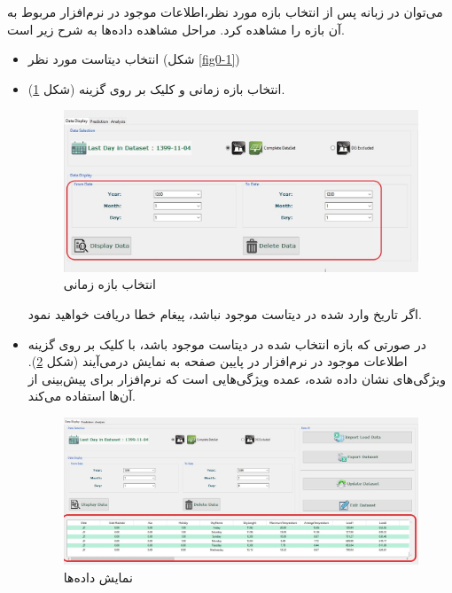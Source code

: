 \documentclass[a4paper,20pt,dvipsnames, usenames]{extbook}
\begin{document}
می‌توان در زبانه  پس از انتخاب بازه مورد نظر،‌اطلاعات موجود در نرم‌افزار مربوط به آن بازه را مشاهده کرد. 
مراحل مشاهده داده‌ها به شرح زیر است.
\begin{itemize}
	\item
	انتخاب دیتاست مورد نظر (شکل \ref{fig0-1})
	
	\item
	انتخاب بازه زمانی و کلیک بر روی گزینه 
(شکل
\ref{fig2}).
	\begin{figure}[!h]
		\centering
		\includegraphics[width = \textwidth]{fig16}
		\caption{انتخاب بازه زمانی}
		\label{fig2}
	\end{figure}
	اگر تاریخ وارد شده در دیتاست موجود نباشد،‌‌ پیغام خطا دریافت خواهید نمود.
	\item
	در صورتی که بازه انتخاب شده در دیتاست موجود باشد، با کلیک بر روی گزینه 
	اطلاعات موجود در نرم‌افزار در پایین صفحه به نمایش درمی‌آیند (شکل
	\ref{fig4}). ویژگی‌های نشان داده شده، عمده ویژگی‌هایی است که نرم‌افزار برای پیش‌بینی از آن‌ها استفاده می‌کند.
	\begin{figure}[!h]
		\centering
		\includegraphics[width = \textwidth]{fig17}
		\caption{نمایش داده‌ها}
		\label{fig4}
	\end{figure}
\end{itemize}
\end{document}
